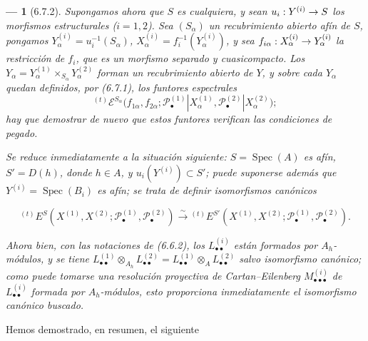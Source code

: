 \documentclass[10pt,oneside,openany]{book}
\theoremstyle{egaenv}\newtheorem*{env}{---}
\theoremstyle{egastatement}
\theoremstyle{egadescription}
\renewcommand{\to}{\mathchoice{\longrightarrow}{\rightarrow}{\rightarrow}{\rightarrow}}
\begin{document}
\begin{env}[6.7.2]
\label{III.6.7.2}
Supongamos ahora que $S$ es cualquiera, y sean
$u_i:Y^{(i)}\to S$ los morfismos estructurales ($i=1,2$). Sea $(S_\alpha)$ un
recubrimiento abierto afín de $S$, pongamos
$Y_\alpha^{(i)}=u_i^{-1}(S_\alpha)$,
$X_\alpha^{(i)}=f_i^{-1}(Y_\alpha^{(i)})$, y sea
$f_{i\alpha}:X_\alpha^{(i)}\to Y_\alpha^{(i)}$ la restricción de $f_i$, que
es un morfismo separado y cuasicompacto. Los
$Y_\alpha=Y_\alpha^{(1)}\times_{S_\alpha}Y_\alpha^{(2)}$ forman un
recubrimiento abierto de $Y$, y sobre cada $Y_\alpha$ quedan definidos, por
(6.7.1), los funtores espectrales
\[
  {}^{(t)}\mathscr E^{S_\alpha}
  \bigl(f_{1\alpha},f_{2\alpha};
    \mathscr P_\bullet^{(1)}|X_\alpha^{(1)},
    \mathscr P_\bullet^{(2)}|X_\alpha^{(2)}\bigr);
\]
hay que demostrar de nuevo que estos funtores verifican las condiciones de
pegado.

Se reduce inmediatamente a la situación siguiente:
$S=\operatorname{Spec}(A)$ es afín, $S'=D(h)$, donde $h\in A$, y
$u_i(Y^{(i)})\subset S'$; puede suponerse además que
$Y^{(i)}=\operatorname{Spec}(B_i)$ es afín; se trata de definir isomorfismos
canónicos

\label{III.6.7.2.1}
\[
  {}^{(t)}E^S
  (X^{(1)},X^{(2)};
   \mathscr P_\bullet^{(1)},\mathscr P_\bullet^{(2)})
  \xrightarrow{\sim}
  {}^{(t)}E^{S'}
  (X^{(1)},X^{(2)};
   \mathscr P_\bullet^{(1)},\mathscr P_\bullet^{(2)}).
  \tag{6.7.2.1}\label{III.6.7.2.1.fr}
\]

Ahora bien, con las notaciones de (6.6.2), los
$L_{\bullet\bullet}^{(i)}$ están formados por $A_h$-módulos, y se tiene
$L_{\bullet\bullet}^{(1)}\otimes_{A_h}L_{\bullet\bullet}^{(2)}
=L_{\bullet\bullet}^{(1)}\otimes_A L_{\bullet\bullet}^{(2)}$ salvo
isomorfismo canónico; como puede tomarse una resolución proyectiva de
Cartan--Eilenberg $M_{\bullet\bullet\bullet}^{(i)}$ de
$L_{\bullet\bullet}^{(i)}$ formada por $A_h$-módulos, esto proporciona
inmediatamente el isomorfismo canónico buscado.
\end{env}

Hemos demostrado, en resumen, el siguiente
\end{document}
